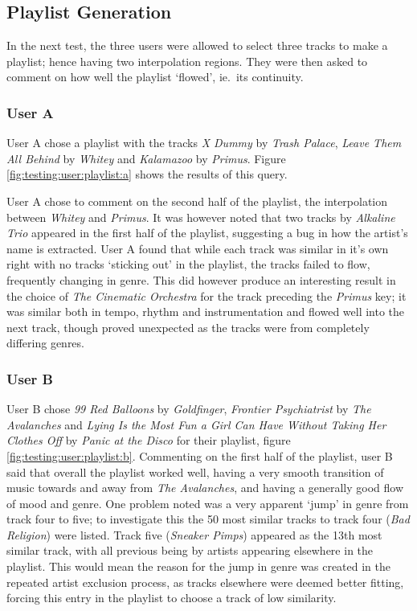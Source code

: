 \subsection{Playlist Generation}
In the next test, the three users were allowed to select three tracks to make a playlist; hence having two interpolation regions. They were then asked to comment on how well the playlist `flowed', ie.\ its continuity.
\subsubsection{User A}
User A chose a playlist with the tracks \emph{X Dummy} by \emph{Trash Palace}, \emph{Leave Them All Behind} by \emph{Whitey} and \emph{Kalamazoo} by \emph{Primus}. Figure \ref{fig:testing:user:playlist:a} shows the results of this query.

User A chose to comment on the second half of the playlist, the interpolation between \emph{Whitey} and \emph{Primus}. It was however noted that two tracks by \emph{Alkaline Trio} appeared in the first half of the playlist, suggesting a bug in how the artist's name is extracted. User A found that while each track was similar in it's own right with no tracks `sticking out' in the playlist, the tracks failed to flow, frequently changing in genre. This did however produce an interesting result in the choice of \emph{The Cinematic Orchestra} for the track preceding the \emph{Primus} key; it was similar both in tempo, rhythm and instrumentation and flowed well into the next track, though proved unexpected as the tracks were from completely differing genres.

\subsubsection{User B}
User B chose \emph{99 Red Balloons} by \emph{Goldfinger}, \emph{Frontier Psychiatrist} by \emph{The Avalanches} and \emph{Lying Is the Most Fun a Girl Can Have Without Taking Her Clothes Off} by \emph{Panic at the Disco} for their playlist, figure \ref{fig:testing:user:playlist:b}. Commenting on the first half of the playlist, user B said that overall the playlist worked well, having a very smooth transition of music towards and away from \emph{The Avalanches}, and having a generally good flow of mood and genre. One problem noted was a very apparent `jump' in genre from track four to five; to investigate this the 50 most similar tracks to track four (\emph{Bad Religion}) were listed. Track five (\emph{Sneaker Pimps}) appeared as the 13th most similar track, with all previous being by artists appearing elsewhere in the playlist. This would mean the reason for the jump in genre was created in the repeated artist exclusion process, as tracks elsewhere were deemed better fitting, forcing this entry in the playlist to choose a track of low similarity.

